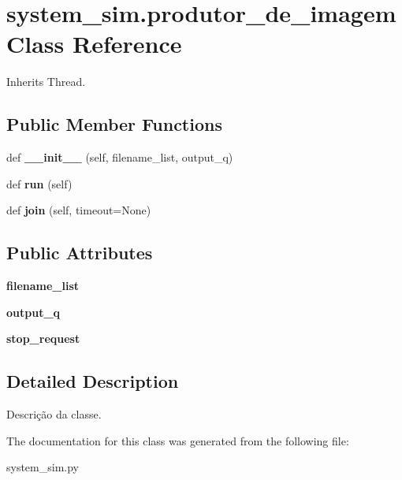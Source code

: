 \hypertarget{classsystem__sim_1_1produtor__de__imagem}{}\section{system\+\_\+sim.\+produtor\+\_\+de\+\_\+imagem Class Reference}
\label{classsystem__sim_1_1produtor__de__imagem}


Inherits Thread.

\subsection*{Public Member Functions}
\begin{DoxyCompactItemize}
\item 
\mbox{\label{classsystem__sim_1_1produtor__de__imagem_a3e1e96f5517057ea2954617d4ea057bc}} 
def {\bfseries \+\_\+\+\_\+init\+\_\+\+\_\+} (self, filename\+\_\+list, output\+\_\+q)
\item 
\mbox{\label{classsystem__sim_1_1produtor__de__imagem_a03c64b331b00a1752e98423bf8c9b6c7}} 
def {\bfseries run} (self)
\item 
\mbox{\label{classsystem__sim_1_1produtor__de__imagem_a18fe507bf7ce5ab89bd85d9e6b42cc04}} 
def {\bfseries join} (self, timeout=None)
\end{DoxyCompactItemize}
\subsection*{Public Attributes}
\begin{DoxyCompactItemize}
\item 
\mbox{\label{classsystem__sim_1_1produtor__de__imagem_a5d6c364d53fecbbf975949f08e16a03a}} 
{\bfseries filename\+\_\+list}
\item 
\mbox{\label{classsystem__sim_1_1produtor__de__imagem_af1e189312296f0b870f6a25bd08d8917}} 
{\bfseries output\+\_\+q}
\item 
\mbox{\label{classsystem__sim_1_1produtor__de__imagem_a9cd9bd98c94e6f806a4a62c0f6917bf5}} 
{\bfseries stop\+\_\+request}
\end{DoxyCompactItemize}


\subsection{Detailed Description}
\begin{DoxyVerb}Descrição da classe.
\end{DoxyVerb}
 

The documentation for this class was generated from the following file\+:\begin{DoxyCompactItemize}
\item 
system\+\_\+sim.\+py\end{DoxyCompactItemize}
